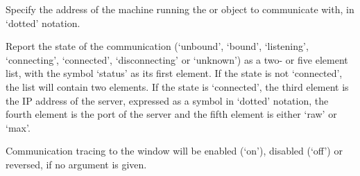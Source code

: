   Specify the address of the machine running the  or 
  object to communicate with, in `dotted' notation.

  Report the state of the communication (`unbound', `bound', `listening', `connecting', `connected',
  `disconnecting' or `unknown') as a two- or five element list, with the symbol `status' as its
  first element.
  If the state is not `connected', the list will contain two elements.
  If the state is `connected', the third element is the IP address of the server, expressed as a
  symbol in `dotted' notation, the fourth element is the port of the server and the fifth element is either
  `raw' or `max'.

  Communication tracing to the \MaxName{} window will be enabled (`on'), disabled (`off') or reversed,
  if no argument is given.
  
  \objListCmdEnd

\objItemFile

\objItemMessage[]

